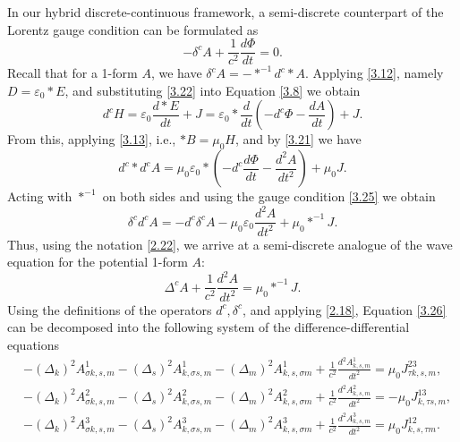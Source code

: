 \documentclass[english]{article}
\theoremstyle{plain}
\theoremstyle{definition}
\theoremstyle{remark}
\numberwithin{equation}{section}
\begin{document}
In our hybrid discrete-continuous framework, a semi-discrete counterpart of the Lorentz gauge condition can be formulated as
\begin{equation}\label{3.25}
 -\delta^cA+\frac{1}{c^2}\frac{d\Phi}{dt}=0.
 \end{equation}
 Recall that for a 1-form $A$,  we have $\delta^cA=-\ast^{-1}d^c\ast A$.
Applying \eqref{3.12}, namely $D=\varepsilon_0\ast E$, and substituting \eqref{3.22} into Equation \eqref{3.8} we obtain
\begin{equation*}\label{}
 d^cH=\varepsilon_0\frac{d\ast E}{dt}+J=\varepsilon_0\ast\frac{d}{dt}\left(-d^c \Phi-\frac{dA}{dt}\right)+J.
 \end{equation*}
From this, applying  \eqref{3.13}, i.e., $\ast B=\mu_0 H$, and by \eqref{3.21} we have
\begin{equation*}\label{}
 d^c\ast d^c A=\mu_0\varepsilon_0\ast\left(-d^c \frac{d\Phi}{dt}-\frac{d^2A}{dt^2}\right)+\mu_0J.
 \end{equation*}
 Acting with $\ast^{-1}$ on both sides and  using the gauge condition \eqref{3.25} we obtain
 \begin{equation*}\label{}
\delta^cd^c A=-d^c\delta^c A-\mu_0\varepsilon_0\frac{d^2A}{dt^2}+\mu_0\ast^{-1}J.
 \end{equation*}
 Thus, using the notation  \eqref{2.22}, we arrive at a semi-discrete analogue of the wave equation for the potential 1-form $A$:
 \begin{equation}\label{3.26}
\Delta^c A+\frac{1}{c^2}\frac{d^2A}{dt^2}=\mu_0\ast^{-1}J.
 \end{equation}
  Using the definitions of the operators $d^c, \delta^c$, and  applying \eqref{2.18}, Equation \eqref{3.26} can be decomposed into the following system of the difference-differential equations
 \begin{align*}\label{}
&-(\Delta_k)^2A^1_{\sigma k,s,m}-(\Delta_s)^2A^1_{k,\sigma s,m}-(\Delta_m)^2A^1_{k,s,\sigma m}+\frac{1}{c^2}\frac{d^2A^1_{k,s,m}}{dt^2}=\mu_0J^{23}_{\tau k,s,m},\\
&-(\Delta_k)^2A^2_{\sigma k,s,m}-(\Delta_s)^2A^2_{k,\sigma s,m}-(\Delta_m)^2A^2_{k,s,\sigma m}+\frac{1}{c^2}\frac{d^2A^2_{k,s,m}}{dt^2}=-\mu_0J^{13}_{k, \tau s,m},\\
&-(\Delta_k)^2A^3_{\sigma k,s,m}-(\Delta_s)^2A^3_{k,\sigma s,m}-(\Delta_m)^2A^3_{k,s,\sigma m}+\frac{1}{c^2}\frac{d^2A^3_{k,s,m}}{dt^2}=\mu_0J^{12}_{k,s,\tau m}.
 \end{align*}
\end{document}
